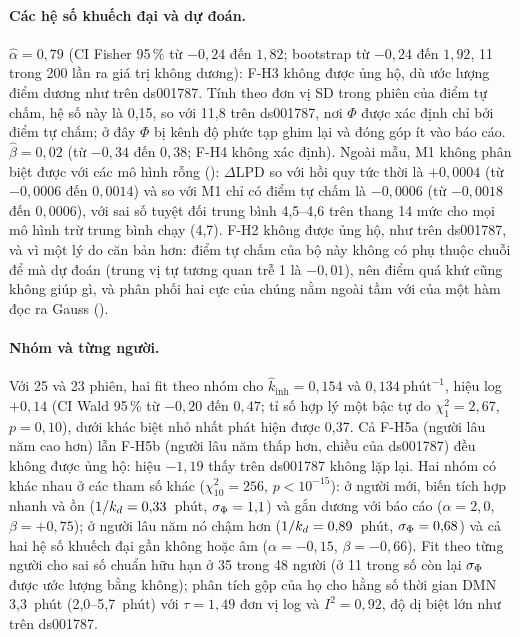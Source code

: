 \paragraph{Các hệ số khuếch đại và dự đoán.} $\hat\alpha=0{,}79$ (CI Fisher 95\,\% từ $-0{,}24$ đến $1{,}82$; bootstrap từ $-0{,}24$ đến $1{,}92$, 11 trong 200 lần ra giá trị không dương): F-H3 không được ủng hộ, dù ước lượng điểm dương như trên ds001787. Tính theo đơn vị SD trong phiên của điểm tự chấm, hệ số này là 0,15, so với 11,8 trên ds001787, nơi $\Phi$ được xác định chỉ bởi điểm tự chấm; ở đây $\Phi$ bị kênh độ phức tạp ghim lại và đóng góp ít vào báo cáo. $\hat\beta=0{,}02$ (từ $-0{,}34$ đến $0{,}38$; F-H4 không xác định). Ngoài mẫu, M1 không phân biệt được với các mô hình rỗng (): $\Delta$LPD so với hồi quy tức thời là $+0{,}0004$ (từ $-0{,}0006$ đến $0{,}0014$) và so với M1 chỉ có điểm tự chấm là $-0{,}0006$ (từ $-0{,}0018$ đến $0{,}0006$), với sai số tuyệt đối trung bình 4,5--4,6 trên thang 14 mức cho mọi mô hình trừ trung bình chạy (4,7). F-H2 không được ủng hộ, như trên ds001787, và vì một lý do căn bản hơn: điểm tự chấm của bộ này không có phụ thuộc chuỗi để mà dự đoán (trung vị tự tương quan trễ 1 là $-0{,}01$), nên điểm quá khứ cũng không giúp gì, và phân phối hai cực của chúng nằm ngoài tầm với của một hàm đọc ra Gauss ().

\paragraph{Nhóm và từng người.} Với 25 và 23 phiên, hai fit theo nhóm cho $\hat k_{\mathrm{inh}}=0{,}154$ và $0{,}134~\text{phút}^{-1}$, hiệu log $+0{,}14$ (CI Wald 95\,\% từ $-0{,}20$ đến $0{,}47$; tỉ số hợp lý một bậc tự do $\chi^2_1=2{,}67$, $p=0{,}10$), dưới khác biệt nhỏ nhất phát hiện được 0,37. Cả F-H5a (người lâu năm cao hơn) lẫn F-H5b (người lâu năm thấp hơn, chiều của ds001787) đều không được ủng hộ: hiệu $-1{,}19$ thấy trên ds001787 không lặp lại. Hai nhóm có khác nhau ở các tham số khác ($\chi^2_{10}=256$, $p<10^{-15}$): ở người mới, biến tích hợp nhanh và ồn ($1/k_{d}=0{,}33$~phút, $\sigma_{\Phi}=1{,}1$) và gắn dương với báo cáo ($\alpha=2{,}0$, $\beta=+0{,}75$); ở người lâu năm nó chậm hơn ($1/k_{d}=0{,}89$~phút, $\sigma_{\Phi}=0{,}68$) và cả hai hệ số khuếch đại gần không hoặc âm ($\alpha=-0{,}15$, $\beta=-0{,}66$). Fit theo từng người cho sai số chuẩn hữu hạn ở 35 trong 48 người (ở 11 trong số còn lại $\sigma_{\Phi}$ được ước lượng bằng không); phân tích gộp của họ cho hằng số thời gian DMN 3,3~phút (2,0--5,7~phút) với $\tau=1{,}49$ đơn vị log và $I^2=0{,}92$, độ dị biệt lớn như trên ds001787.

